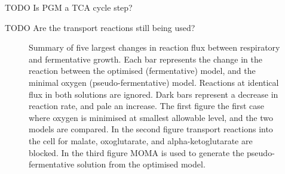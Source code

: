 TODO Is PGM a TCA cycle step?

TODO Are the transport reactions still being used?

\begin{figure}
  \centering
  \hfill
  \caption[Reaction changes between respiratory and fermentative growth]{Summary of five largest changes in reaction flux between respiratory and fermentative growth. Each bar represents the change in the reaction between the optimised (fermentative) model, and the minimal oxygen (pseudo-fermentative) model. Reactions at identical flux in both solutions are ignored. Dark bars represent a decrease in reaction rate, and pale an increase. The first figure the first case where oxygen is minimised at smallest allowable level, and the two models are compared. In the second figure transport reactions into the cell for malate, oxoglutarate, and alpha-ketoglutarate are blocked. In the third figure MOMA \cite{segre2002} is used to generate the pseudo-fermentative solution from the optimised model.}
  \label{figure:most_changing_reactions}
\end{figure}

